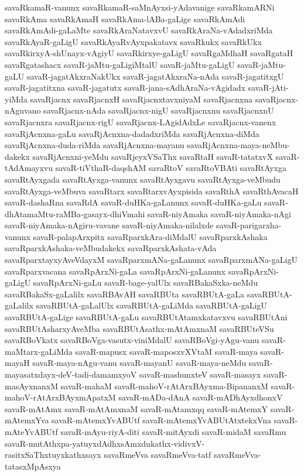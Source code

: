 {savaRkamaR-vanunx
savaRkamaR-saMnAyxsi-yAdavanige
savaRkamARNi
savaRkAma
savaRkAmaH
savaRkAma-lABa-gaLige
savaRkAmAdi
savaRkAmAdi-gaLaMte
savaRkAraNatavxvU
savaRkAraNa-vAdadxriMda
savaRkAyaR-gaLigU
savaRkAyaRvAyxpakatavx
savaRkukx
savaRkUkx
savaRkirxyA-shUnayx-vAgiyU
savaRkirxye-gaLigU
savaRgaMdhaH
savaRgataH
savaRgatashacx
savaR-jaMtu-gaLigiMtalU
savaR-jaMtu-gaLigU
savaR-jaMtu-gaLU
savaR-jagatAkxraNakUkx
savaR-jagatAkxraNa-nAda
savaR-jagatitxgU
savaR-jagatitxna
savaR-jagatutx
savaR-jana-sAdhAraNa-vAgidadx
savaR-jAti-yiMda
savaRjacnx
savaRjacnxH
savaRjacnxtavxniyaM
savaRjacnxna
savaRjacnx-nAguvano
savaRjacnx-nAda
savaRjacnx-nigU
savaRjacnxnu
savaRjacnxnU
savaRjacnxra
savaRjacnx-rigU
savaRjacnx-LAgidAdxLe
savaRjacnx-vanenx
savaRjAcnxna-gaLu
savaRjAcnxna-dadadxriMda
savaRjAcnxna-diMda
savaRjAcnxna-duda-riMda
savaRjAcnxna-mayanu
savaRjAcnxna-maya-neMbu-dakekx
savaRjAcnxni-yeMdu
savaRjeyxVSaThx
savaRtaH
savaR-tatatxvX
savaR-tAdAmayxvu
savaR-tiVthaR-daqshAM
savaRtoV
savaRtoVBAti
savaRtAyxga
savaRtAyxgada
savaRtAyxga-vanunx
savaRtAyxgavu
savaRtAyxga-veMbudu
savaRtAyxga-veMbuva
savaRtarx
savaRtarxvAyxpisida
savaRthA
savaRthAvacaH
savaR-dashaRna
savaRdA
savaR-duHKa-gaLanunx
savaR-duHKa-gaLu
savaR-dhAtamaMtu-raMBa-gasayx-dhiVmahi
savaR-niyAmaka
savaR-niyAmaka-nAgi
savaR-niyAmaka-nAgiru-vavane
savaR-niyAmaka-nilalxde
savaR-parigarxha-vanunx
savaR-palapArxpitx
savaRparxkAra-diMdalU
savaRparxkAshaka
savaRparxkAshaka-veMbudakekx
savaRparxkAshata-vAda
savaRparxtayxyAveVdayxM
savaRparxmANa-gaLanunx
savaRparxmANa-gaLigU
savaRparxvacana
savaRpArxNi-gaLa
savaRpArxNi-gaLanunx
savaRpArxNi-gaLigU
savaRpArxNi-gaLu
savaR-bage-yalUlx
savaRBakaSxka-neMdu
savaRBakaSx-gaLalilx
savaRBAvAH
savaRBUta
savaRBUtA-gaLa
savaRBUtA-gaLalilx
savaRBUtA-gaLalUlx
savaRBUtA-gaLiMda
savaRBUtA-gaLigU
savaRBUtA-gaLige
savaRBUtA-gaLu
savaRBUtAtamxkatavxvu
savaRBUtAni
savaRBUtAsharxyAveMba
savaRBUtAsathx-mAtAmxnaM
savaRBUteVSu
savaRBoVkatx
savaRBoVga-vasutx-viniMdalU
savaRBoVgi-yAgu-vanu
savaR-maMtarx-gaLiMda
savaR-mapusx
savaR-maposxvXVtaM
savaR-maya
savaR-mayaH
savaR-maya-nAgu-vanu
savaR-mayanU
savaR-maya-neMdu
savaR-mayasatxdayx-deV-tadi-damamxyoV
savaR-mashunxteV
savaR-masayx
savaR-masAyxnanxM
savaR-mahaM
savaR-mahoV-rAtArxBAyxma-BipananxM
savaR-mahoV-rAtArxBAyxmApatxM
savaR-mADa-dAnA
savaR-mADhAyxdhonxV
savaR-mAtAmx
savaR-mAtAmxnaM
savaR-mAtamxqq
savaR-mAtemxY
savaR-mAtemxYva
savaR-mAtemxYvABUtf
savaR-mAtemxYvABUtAtxtekxVna
savaR-mAteYvABUtf
savaR-mAyu-riyA-diti
savaR-mitAyxdi
savaR-midaM
savaRmu
savaR-mutAthxpa-yatuyxdAdhxsAmxdukathx-vidivxV-rasitxSaThxtuyxkathxsayx
savaRmeVva
savaRmeVva-tatf
savaRmeVva-tatasxMpAsxya
}
